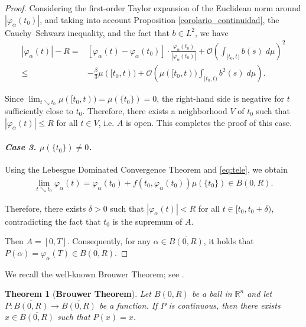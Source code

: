 \documentclass[a4paper,11pt]{amsart}
\theoremstyle{plain}
\newtheorem{thm}{Theorem}[section]
\theoremstyle{remark}
\newcommand{\rr}{\mathbb{R}}
\numberwithin{equation}{section}
\begin{document}
\begin{proof}
Considering the first-order Taylor expansion of the Euclidean norm around $|\varphi_\alpha(t_0)|$, and taking into account Proposition \ref{corolario_continuidad}, the Cauchy--Schwarz inequality, and the fact that $b\in L^2$, we have
\begin{equation*}
    \begin{split}
    |\varphi_\alpha(t)|-R=&\left[\varphi_\alpha(t)-\varphi_\alpha(t_0)\right]\cdot\frac{\varphi_\alpha(t_0)}{|\varphi_\alpha(t_0)|} +\mathcal{O}\left(\int_{[t_0,t)}b(s)\;d\mu\right)^2\\
    \leq & -\frac{\beta}{3}\mu([t_0,t)) +\mathcal{O}\left( \mu([t_0,t))\int_{[t_0,t)}b^2(s)\;d\mu\right).
     \end{split}
\end{equation*}

Since $\lim_{t\searrow t_0}\mu([t_0,t))=\mu(\{t_0\})=0$, the right-hand side is negative for $t$ sufficiently close to $t_0$. Therefore, there exists a neighborhood $V$ of $t_0$ such that $|\varphi_\alpha(t)|\leq R$ for all $t\in V$, i.e. $A$ is open. This completes the proof of this case.
     
\paragraph{\emph{Case 3.  $\mu(\{t_0\})\neq 0$.}} 
Using the Lebesgue Dominated Convergence Theorem and \ref{eq:tele}, we obtain  
\begin{equation*}
    \begin{split}
        \lim_{t\searrow t_0}\varphi_{\alpha}(t)= \varphi_{\alpha}(t_0)+ f(t_0,\varphi_{\alpha}(t_0))\mu(\{t_0\})\in B(0,R).
    \end{split}
\end{equation*}

Therefore, there exists $\delta>0$ such that $|\varphi_\alpha(t)|<R$ for all $t\in [t_0,t_0+\delta)$, contradicting the fact that $t_0$ is the supremum of $A$.

Then $A=[0,T]$. Consequently, for any $\alpha\in\overline{B(0,R)}$, it holds that $P(\alpha)=\varphi_\alpha(T)\in\overline{B(0,R)}.$ 
	  	\end{proof}


 We recall the well-known Brouwer Theorem; see \cite{AlessandroFonda862}. 

\begin{thm}[\textbf{Brouwer Theorem}]\label{th:Brouwer}
 	Let $B(0,R)$ be a ball in $\rr^n$ and let $P:\overline{B(0,R)}\to \overline{B(0,R)}$ be a function. If $P$ is continuous, then there exists $x \in \overline{B(0,R)}$ such that $P(x) = x$.
\end{thm}
\end{document}

